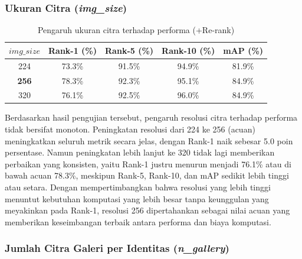 \subsubsection{Ukuran Citra (\textit{img\_size})}

\begin{table}[H]
    \centering
    \caption{Pengaruh ukuran citra terhadap performa (+Re-rank)}
    \label{tab:var_imgsize}
    \renewcommand{\arraystretch}{1.25}
    \begin{tabular}{ccccc}
        \hline
        $\mathit{img\_size}$ & \textbf{Rank-1 (\%)} & \textbf{Rank-5 (\%)} & \textbf{Rank-10 (\%)} & \textbf{mAP (\%)} \\
        \hline
        224                  & 73.3\%               & 91.5\%               & 94.9\%                & 81.9\%            \\
        \textbf{256}         & 78.3\%               & 92.3\%               & 95.1\%                & 84.9\%            \\
        320                  & 76.1\%               & 92.5\%               & 96.0\%                & 84.9\%            \\
        \hline
    \end{tabular}
\end{table}

Berdasarkan hasil pengujian tersebut, pengaruh resolusi citra terhadap performa tidak bersifat monoton. Peningkatan resolusi dari 224 ke 256 (acuan) meningkatkan seluruh metrik secara jelas, dengan Rank-1 naik sebesar 5.0 poin persentase. Namun peningkatan lebih lanjut ke 320 tidak lagi memberikan perbaikan yang konsisten, yaitu Rank-1 justru menurun menjadi 76.1\% atau di bawah acuan 78.3\%, meskipun Rank-5, Rank-10, dan mAP sedikit lebih tinggi atau setara. Dengan mempertimbangkan bahwa resolusi yang lebih tinggi menuntut kebutuhan komputasi yang lebih besar tanpa keunggulan yang meyakinkan pada Rank-1, resolusi 256 dipertahankan sebagai nilai acuan yang memberikan keseimbangan terbaik antara performa dan biaya komputasi.

\subsubsection{Jumlah Citra Galeri per Identitas (\textit{n\_gallery})}

